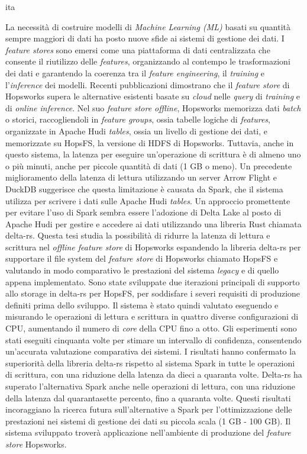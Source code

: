 \markboth{\abstractname}{}
\begin{scontents}[store-env=lang]
ita
\end{scontents}
\begin{scontents}[store-env=abstracts,print-env=true]
La necessità di costruire modelli di \textit{Machine Learning (ML)} basati su quantità sempre maggiori di dati ha posto nuove sfide ai sistemi di gestione dei dati. I \textit{feature stores} sono emersi come una piattaforma di dati centralizzata che consente il riutilizzo delle \textit{features}, organizzando al contempo le trasformazioni dei dati e garantendo la coerenza tra il \textit{feature engineering}, il \textit{training} e l'\textit{inference} dei modelli. Recenti pubblicazioni dimostrano che il \textit{feature store} di Hopsworks supera le alternative esistenti basate su \textit{cloud} nelle \textit{query} di \textit{training} e di \textit{online inference}. Nel suo \textit{feature store offline}, Hopsworks memorizza dati \textit{batch} o storici, raccogliendoli in \textit{feature groups}, ossia tabelle logiche di \textit{features}, organizzate in Apache Hudi \textit{tables}, ossia un livello di gestione dei dati, e memorizzate su HopsFS, la versione di HDFS di Hopsworks. Tuttavia, anche in questo sistema, la latenza per eseguire un'operazione di scrittura è di almeno uno o più minuti, anche per piccole quantità di dati (1 GB o meno). Un precedente miglioramento della latenza di lettura utilizzando un server Arrow Flight e DuckDB suggerisce che questa limitazione è causata da Spark, che il sistema utilizza per scrivere i dati sulle Apache Hudi \textit{tables}. 
Un approccio promettente per evitare l'uso di Spark sembra essere l'adozione di Delta Lake al posto di Apache Hudi per gestire e accedere ai dati utilizzando una libreria Rust chiamata delta-rs. Questa tesi studia la possibilità di ridurre la latenza di lettura e scrittura nel \textit{offline feature store} di Hopsworks espandendo la libreria delta-rs per supportare il file system del \textit{feature store} di Hopsworks chiamato HopsFS e valutando in modo comparativo le prestazioni del sistema \textit{legacy} e di quello appena implementato. Sono state sviluppate due iterazioni principali di supporto allo storage in delta-rs per HopsFS, per soddisfare i severi requisiti di produzione definiti prima dello sviluppo. Il sistema è stato quindi valutato eseguendo e misurando le operazioni di lettura e scrittura in quattro diverse configurazioni di CPU, aumentando il numero di \textit{core} della CPU fino a otto. Gli esperimenti sono stati eseguiti cinquanta volte per stimare un intervallo di confidenza, consentendo un'accurata valutazione comparativa dei sistemi. I risultati hanno confermato la superiorità della libreria delta-rs rispetto al sistema Spark in tutte le operazioni di scrittura, con una riduzione della latenza da dieci a quaranta volte. Delta-rs ha superato l'alternativa Spark anche nelle operazioni di lettura, con una riduzione della latenza dal quarantasette percento, fino a quaranta volte. Questi risultati incoraggiano la ricerca futura sull'alternative a Spark per l'ottimizzazione delle prestazioni nei sistemi di gestione dei dati su piccola scala (1 GB - 100 GB). Il sistema sviluppato troverà applicazione nell'ambiente di produzione del \textit{feature store} Hopsworks.

\end{scontents}
